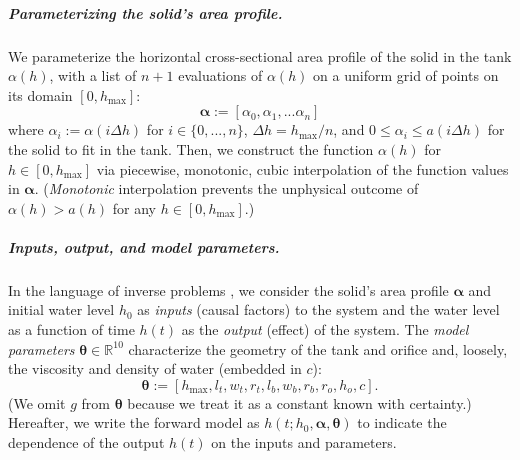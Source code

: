 \documentclass[a4paper,fleqn]{cas-dc}
\newcommand\themodel {$h(t; h_0, \boldsymbol \alpha, \boldsymbol\theta)$\xspace}
\begin{document}
\subparagraph{Parameterizing the solid's area profile.} \label{sec:alpha}
We parameterize the horizontal cross-sectional area profile of the solid in the tank $\alpha(h)$, with a list of $n+1$ evaluations of $\alpha(h)$ on a uniform grid of points on its domain $[0, h_{\text{max}}]$:
\begin{equation}
	\boldsymbol \alpha := [\alpha_0, \alpha_1, ... \alpha_n] \label{eq:alpha}
\end{equation}
where $\alpha_i :=\alpha(i \Delta h)$ for $i \in \{0, ..., n\}$, $\Delta h = h_{\text{max}}/n$, and $0 \leq \alpha_i \leq a(i\Delta h)$ for the solid to fit in the tank.
Then, we construct the function $\alpha(h)$ for $h\in [0, h_{\text{max}}]$ via piecewise, monotonic, cubic interpolation \cite{fritsch1984method} of the function values in $\boldsymbol \alpha$. (\emph{Monotonic} interpolation prevents the unphysical outcome of $\alpha(h) > a(h)$ for any $h \in [0, h_{\text{max}}]$.) 


\subparagraph{Inputs, output, and model parameters.} 
In the language of inverse problems \cite{groetsch1999inverse,waqar2023tutorial}, we 
consider the solid's area profile $\boldsymbol \alpha$ and initial water level $h_0$ as \emph{inputs} (causal factors) to the system and the water level as a function of time $h(t)$ as the \emph{output} (effect) of the system.
The \emph{model parameters} $\boldsymbol \theta \in \mathbb{R}^{10}$ characterize the geometry of the tank and orifice and, loosely, the viscosity and density of water (embedded in $c$):
\begin{equation}
	\boldsymbol \theta := [h_{\text{max}}, l_t, w_t, r_t, l_b, w_b, r_b, r_o, h_o, c]. \label{eq:theta}
\end{equation}
(We omit $g$ from $\boldsymbol \theta$ because we treat it as a constant known with certainty.)
Hereafter, we write the forward model as \themodel to indicate the dependence of the output $h(t)$ on the inputs and parameters.
\end{document}
